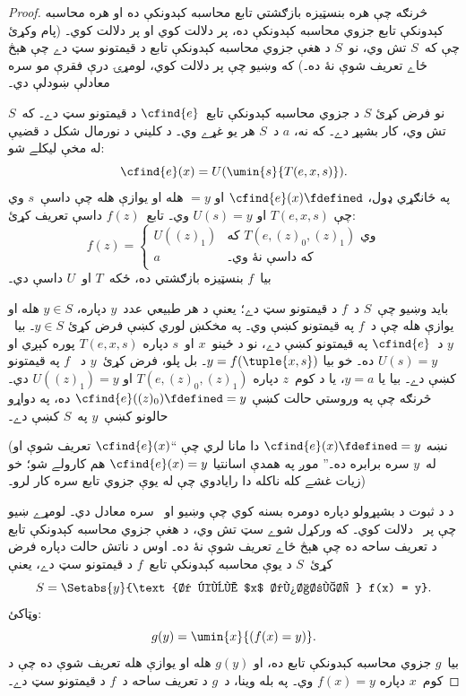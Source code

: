 \documentclass[../../../include/open-logic-section]{subfiles}
\begin{document}
\begin{proof}
څرنګه چې هره بنسټيزه بازګشتي تابع محاسبه کېدونکې ده او هره محاسبه
کېدونکې تابع جزوي محاسبه کېدونکې ده،  پر
 دلالت کوي او  پر
 دلالت کوي۔ (پام وکړئ چې که~$S$ تش وي، نو~$S$ د
هغې جزوي محاسبه کېدونکې تابع د قيمتونو سټ دے چې هېڅ ځاے تعريف شوې
نۀ ده۔) که وښيو چې  پر
 دلالت کوي، لومړۍ درې فقرې مو سره معادلې ښودلې
دي۔

نو فرض کړئ $S$ د جزوي محاسبه کېدونکې تابع~$\cfind{e}$ د قيمتونو سټ
دے۔ که~$S$ تش وي، کار بشپړ دے۔ که نه، $a$ د~$S$ هر يو غړے وي۔ د
کليني د نورمال شکل د قضيې له مخې ليکلے شو:
\[
\cfind{e}(x) = U(\umin{s}{T(e, x, s)}).
\]
په ځانګړي ډول، $\cfind{e}(x) \fdefined$ او $= y$ هله او يوازې هله
چې داسې~$s$ وي چې $T(e, x, s)$ او $U(s) = y$ وي۔ تابع~$f(z)$ داسې
تعريف کړئ:
\[
f(z) = \begin{cases}
  U((z)_1) & \text{که $T(e, (z)_0, (z)_1)$ وي} \\
  a        & \text{که داسې نۀ وي۔}
\end{cases}
\]
بيا~$f$ بنسټيزه بازګشتي ده، ځکه~$T$ او~$U$ داسې دي۔

بايد وښيو چې~$S$ د~$f$ د قيمتونو سټ دے؛ يعنې د هر طبيعي عدد~$y$
دپاره، $y \in S$ هله او يوازې هله چې د~$f$ په قيمتونو کښې وي۔ په
مخکښ لوري کښې فرض کړئ $y \in S$۔ بيا~$y$ د~$\cfind{e}$ په قيمتونو
کښې دے، نو د ځينو~$x$ او~$s$ دپاره $T(e,x,s)$ پوره کېږي او
$U(s) = y$ ده۔ خو بيا $y = f(\tuple{x,s})$۔ بل پلو، فرض کړئ~$y$ د
~$f$ په قيمتونو کښې دے۔ بيا يا $y = a$، يا د کوم~$z$ دپاره
$T(e,(z)_0,(z)_1)$ او $U((z)_1) = y$ دي۔ څرنګه چې په وروستي حالت
کښې $\cfind{e}((z)_0) \fdefined = y$ ده، په دواړو حالونو کښې~$y$
په~$S$ کښې دے۔

(نښه $\cfind{e}(x) \fdefined = y$ دا مانا لري چې ``$\cfind{e}(x)$
تعريف شوې او له~$y$ سره برابره ده۔'' موږ په همدې اسانتيا
$\cfind{e}(x) = y$ هم کارولے شو؛ خو زيات غشے کله ناکله دا رايادوي
چې له يوې جزوي تابع سره کار لرو۔)

د  د ثبوت د بشپړولو دپاره دومره بسنه کوي چې
وښيو  او~ سره معادل دي۔ لومړے
ښيو چې  پر~ دلالت کوي۔ که ورکړل
شوے سټ تش وي، د هغې جزوي محاسبه کېدونکې تابع د تعريف ساحه ده چې هېڅ
ځاے تعريف شوې نۀ ده۔ اوس د ناتش حالت دپاره فرض کړئ~$S$ د يوې محاسبه
کېدونکې تابع~$f$ د قيمتونو سټ دے، يعنې
\[
S = \Setabs{y}{\text{د کوم $x$ دپاره، } f(x) = y}.
\]
وټاکئ:
\[
g(y) = \umin{x}{(f(x) = y)}.
\]
بيا~$g$ جزوي محاسبه کېدونکې تابع ده، او $g(y)$ هله او يوازې هله
تعريف شوې ده چې د کوم~$x$ دپاره $f(x) = y$ وي۔ په بله وينا، د~$g$
د تعريف ساحه د~$f$ د قيمتونو سټ دے۔


\end{proof}
\end{document}
